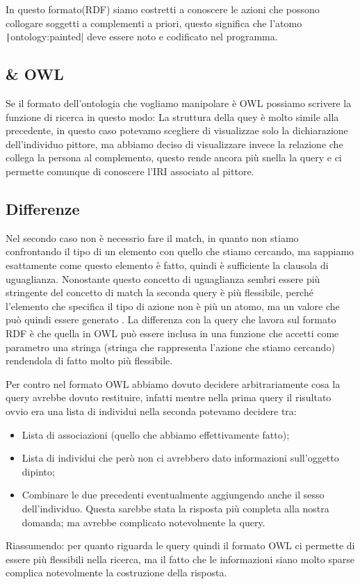 		In questo formato(RDF) siamo costretti a conoscere le azioni che possono collogare soggetti a complementi a priori, questo significa che l'atomo \texttt|ontology:painted| deve essere noto e codificato nel  programma. 
		
	\subsection{\cduce \& OWL}
		Se il formato dell'ontologia che vogliamo manipolare è OWL possiamo scrivere la funzione di ricerca in questo modo:
		La struttura della quey è molto simile alla precedente, in questo caso potevamo scegliere di visualizzae solo la dichiarazione dell'individuo pittore, ma abbiamo deciso di visualizzare invece la relazione che collega la persona al complemento, questo rende ancora più snella la query e ci permette comunque di conoscere l'IRI associato al pittore.
	\subsection{Differenze}
		Nel secondo caso non è necessrio fare il match, in quanto non stiamo confrontando il tipo di un elemento con quello che stiamo cercando, ma sappiamo esattamente come questo elemento è fatto, quindi è sufficiente la clausola di uguaglianza. Nonostante questo concetto di uguaglianza sembri essere più stringente del concetto di match la seconda query è più flessibile, perché l'elemento che specifica il tipo di azione non è più un atomo, ma un valore che può quindi essere generato . La differenza con la query che lavora sul formato RDF è che quella in OWL può essere inclusa in una funzione che accetti come parametro una stringa (stringa che rappresenta l'azione che stiamo cercando) rendendola di fatto molto più flessibile.
		
		Per contro nel formato OWL abbiamo dovuto decidere arbitrariamente cosa la query avrebbe dovuto restituire, infatti mentre nella prima query il risultato ovvio era una lista di individui nella seconda potevamo decidere tra:
		\begin{itemize}
			\item Lista di associazioni (quello che abbiamo effettivamente fatto);
			\item Lista di individui che però non ci avrebbero dato informazioni sull'oggetto dipinto;
			\item Combinare le due precedenti eventualmente aggiungendo anche il sesso dell'individuo. Questa sarebbe stata la risposta più completa alla nostra domanda; ma avrebbe complicato notevolmente la query.
		\end{itemize}
		Riassumendo: per quanto riguarda le query quindi il formato OWL ci permette di essere più flessibili  nella ricerca, ma il fatto che le informazioni siano molto sparse complica notevolmente la costruzione della risposta.
		
		